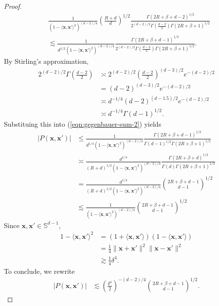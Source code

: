 \documentclass{article}
\theoremstyle{definition}
\renewcommand{\S}{\mathbb{S}}
\def\vx{{\bm{x}}}
\begin{document}
\begin{proof}
   \begin{align}
       &\frac{1}{(1 - \langle \vx, \vx' \rangle^2)^{(d - 2)/4} }\left(\frac{R + d}{d}\right)^{1/2}\frac{\Gamma(2R + \beta + d - 2)^{1/2} }{2^{(d - 2)/2}\Gamma\left(\frac{d - 2}{2}\right)\Gamma(2R + \beta + 1)^{1/2} }\nonumber\\
       &\lesssim \frac{1}{d^{1/2}(1 - \langle \vx, \vx' \rangle^2)^{(d - 2)/4} } \frac{\Gamma(2R + \beta + d - 1)^{1/2} }{2^{(d - 2)/2}\Gamma\left(\frac{d - 2}{2}\right)\Gamma(2R + \beta + 1)^{1/2} }.\label{eqn:gegenbauer-sum-2}
   \end{align}
   By Stirling's approximation,
   \begin{align*}
       2^{(d - 2)/2}\Gamma\left(\frac{d - 2}{2}\right) &\asymp 2^{(d - 2)/2}\left(\frac{d - 2}{2}\right)^{(d - 3)/2 } e^{-(d - 2)/2}\\
       &= (d - 2)^{(d -3 )/2}e^{-(d - 2)/2}\\
       &\asymp d^{-1/4}(d - 2)^{(d - 1.5)/2 }e^{-(d - 2)/2}\\
       &\asymp d^{-1/4}\Gamma(d - 1)^{1/2}.
   \end{align*}
   Substituing this into (\ref{eqn:gegenbauer-sum-2}) yields
   \begin{align*}
       |P(\vx, \vx')| &\leq \frac{1}{d^{1/4}(1 - \langle \vx, \vx' \rangle^2)^{(d-2)/4} }\frac{\Gamma(2R + \beta + d - 1)^{1/2} }{\Gamma(d - 1)^{1/2}\Gamma(2R + \beta + 1)^{1/2} }\\
       &\asymp \frac{d^{1/4}}{(R + d)^{1/2} (1 - \langle \vx, \vx' \rangle^2)^{(d-2)/4} } \frac{\Gamma(2R + \beta + d)^{1/2} }{\Gamma(d)\Gamma(2R + \beta + 1)^{1/2} }\\
       &= \frac{d^{1/4}}{(R + d)^{1/2} (1 - \langle \vx, \vx' \rangle^2)^{(d-2)/4} }\binom{2R + \beta + d - 1}{d - 1}^{1/2}\\
       &\lesssim \frac{1}{(1 - \langle \vx, \vx' \rangle^2)^{(d-2)/4} }\binom{2R + \beta + d - 1}{d - 1}^{1/2}
   \end{align*}
   Since $\vx, \vx' \in \S^{d - 1}$,
   \begin{align*}
       1 - \langle \vx, \vx' \rangle^2 &= (1 + \langle \vx, \vx' \rangle)(1 - \langle \vx, \vx' \rangle)\\
       &= \frac{1}{4}\|\vx + \vx'\|^2 \|\vx - \vx'\|^2\\
       &\gtrsim \frac{1}{4} \delta^4.
   \end{align*}
   To conclude, we rewrite
   \begin{align*}
       |P(\vx, \vx')| &\lesssim \left(\frac{\delta^4}{2} \right)^{-(d-2)/4 } \binom{2R + \beta + d - 1}{d - 1}^{1/2}.
   \end{align*}
\end{proof}
\end{document}
